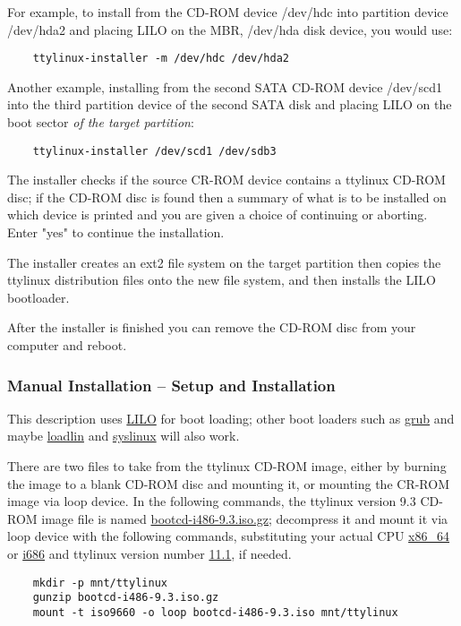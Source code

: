\documentclass[10pt]{article}
\begin{document}
For example, to install from the CD-ROM device /dev/hdc into partition device
/dev/hda2 and placing LILO on the MBR, /dev/hda disk device, you would use:

\begin{lstlisting}
	ttylinux-installer -m /dev/hdc /dev/hda2
\end{lstlisting}

Another example, installing from the second SATA CD-ROM device /dev/scd1 into
the third partition device of the second SATA disk and placing LILO on the boot
sector {\it of the target partition}:

\begin{lstlisting}
	ttylinux-installer /dev/scd1 /dev/sdb3
\end{lstlisting}

The installer checks if the source CR-ROM device contains a ttylinux CD-ROM
disc; if the CD-ROM disc is found then a summary of what is to be installed on
which device is printed and you are given a choice of continuing or aborting.
Enter "yes" to continue the installation.

The installer creates an ext2 file system on the target partition then copies
the ttylinux distribution files onto the new file system, and then installs the
LILO bootloader.

After the installer is finished you can remove the CD-ROM disc from your
computer and reboot.

\subsubsection{Manual Installation -- Setup and Installation}

This description uses \url{LILO} for boot loading; other boot loaders such as
\url{grub} and maybe \url{loadlin} and \url{syslinux} will also work.

There are two files to take from the ttylinux CD-ROM image, either by burning
the image to a blank CD-ROM disc and mounting it, or mounting the CR-ROM image
via loop device. In the following commands, the ttylinux version 9.3 CD-ROM
image file is named \url{bootcd-i486-9.3.iso.gz}; decompress it and mount it
via loop device with the following commands, substituting your actual CPU
\url{x86_64} or \url{i686} and ttylinux version number \url{11.1}, if needed.

\begin{lstlisting}
	mkdir -p mnt/ttylinux
	gunzip bootcd-i486-9.3.iso.gz
	mount -t iso9660 -o loop bootcd-i486-9.3.iso mnt/ttylinux
\end{lstlisting}
\end{document}
